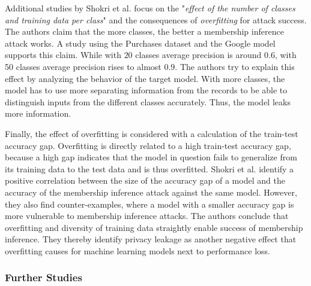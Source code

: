 \documentclass[runningheads]{llncs}
\begin{document}
\par
Additional studies by Shokri et al. focus on the "\textit{effect of the number of classes and training data per class}" and the consequences of \textit{overfitting} for attack success. The authors claim that the more classes, the better a membership inference attack works. A study using the Purchases dataset and the Google model supports this claim. While with $20$ classes average precision is around $0.6$, with 50 classes average precision rises to almost $0.9$. The authors try to explain this effect by analyzing the behavior of the target model. With more classes, the model has to use more separating information from the records to be able to distinguish inputs from the different classes accurately. Thus, the model leaks more information.
\par
Finally, the effect of overfitting is considered with a calculation of the train-test accuracy gap. Overfitting is directly related to a high train-test accuracy gap, because a high gap indicates that the model in question fails to generalize from its training data to the test data and is thus overfitted. Shokri et al. identify a positive correlation between the size of the accuracy gap of a model and the accuracy of the membership inference attack against the same model. However, they also find counter-examples, where a model with a smaller accuracy gap is more vulnerable to membership inference attacks.
The authors conclude that overfitting and diversity of training data straightly enable success of membership inference. They thereby identify privacy leakage as another negative effect that overfitting causes for machine learning models next to performance loss.

\subsubsection{Further Studies}
\end{document}
